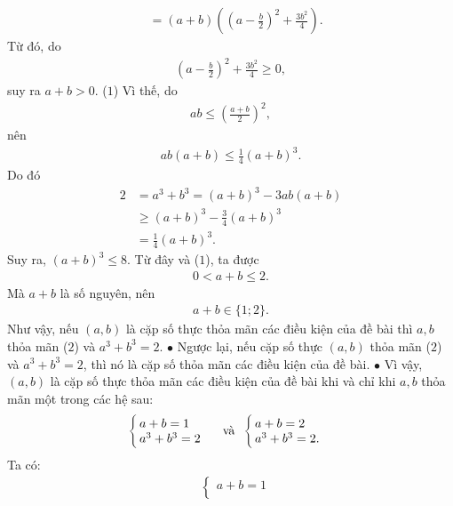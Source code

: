 \begin{multicols}{2}
\begin{align*}
		&= \left( {a + b} \right)\left( {{{\left( {a - \frac{b}{2}} \right)}^2} + \frac{{3{b^2}}}{4}} \right).
	\end{align*}
	Từ đó, do
	\begin{align*}
		{\left( {a - \frac{b}{2}} \right)^2} + \frac{{3{b^2}}}{4} \ge 0,
	\end{align*}
	suy ra $a + b > 0$. \hfill ($1$)
	\vskip 0.05cm
	Vì thế, do
	\begin{align*}
		ab \le {\left( {\frac{{a + b}}{2}} \right)^2},
	\end{align*}
	nên
	\begin{align*}
		ab\left( {a + b} \right) \le \frac{1}{4}{\left( {a + b} \right)^3}.
	\end{align*}
	Do đó
	\begin{align*}
		2 &= {a^3} + {b^3} = {\left( {a + b} \right)^3} - 3ab\left( {a + b} \right) \\[-0.5ex]
		&\ge {\left( {a + b} \right)^3} - \frac{3}{4}{\left( {a + b} \right)^3} \\[-0.5ex]
		&= \frac{1}{4}{\left( {a + b} \right)^3}.
	\end{align*}
	Suy ra, ${\left( {a + b} \right)^3} \le 8.$  Từ đây và ($1$), ta được
	\begin{align*}
		0 < a + b \le 2.
	\end{align*}
	Mà $a + b$ là số nguyên, nên 
	\begin{align*}
		a + b \in \{1; 2\}. \tag{$2$}
	\end{align*}
	Như vậy, nếu $(a, b)$ là cặp số thực thỏa mãn các điều kiện của đề bài thì $a, b$ thỏa mãn ($2$) và $a^3 + b^3 = 2$.
	\vskip 0.05cm 
	$\bullet$ Ngược lại, nếu cặp số thực $(a, b)$ thỏa mãn ($2$) và  $a^3 + b^3 = 2$, thì nó là cặp số thỏa mãn các điều kiện của đề bài.
	\vskip 0.05cm
	$\bullet$ Vì vậy, $(a, b)$ là cặp số thực thỏa mãn các điều kiện của đề bài khi và chỉ khi $a, b$ thỏa mãn một trong các hệ sau:
	\begin{align*}
		\begin{cases}
			a + b = 1\\[-0.5ex]
			a^3 + b^3 = 2
		\end{cases}
		\text{\, và \,} \begin{cases}
			a + b = 2\\[-0.5ex]
			a^3 + b^3 = 2.
		\end{cases}
	\end{align*}
	Ta có:
	\begin{align*}
		&\begin{cases}
			a + b = 1\\

\end{cases}
\end{align*}
\end{multicols}
